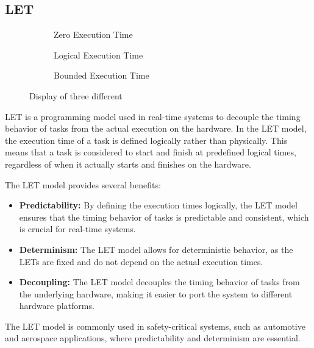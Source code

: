 \subsection{\ac{LET}}\label{sec:let}

\begin{figure}[ht]
	\begin{subfigure}[c]{0.45\textwidth}
		\resizebox{\textwidth}{!}{%
			\label{fig:model_ZET}
			
		}
		\caption{Zero Execution Time}
	\end{subfigure}
	\hfill
	\begin{subfigure}[c]{0.45\textwidth}
		\resizebox{\textwidth}{!}{%
			\label{fig:model_LET}
			
			}
		\caption{Logical Execution Time}
	\end{subfigure}
	\begin{subfigure}[c]{0.450\textwidth}
		\resizebox{\textwidth}{!}{%
			\label{fig:model_BET}
			
		}
		\caption{Bounded Execution Time}
	\end{subfigure}
	\caption{Display of three different }
\end{figure}
\ac{LET} is a programming model used in real-time systems to decouple the timing behavior of tasks from the actual execution on the hardware. In the \ac{LET} model, the execution time of a task is defined logically rather than physically. This means that a task is considered to start and finish at predefined logical times, regardless of when it actually starts and finishes on the hardware.

The \ac{LET} model provides several benefits:
\begin{itemize}
	\item \textbf{Predictability:} By defining the execution times logically, the \ac{LET} model ensures that the timing behavior of tasks is predictable and consistent, which is crucial for real-time systems.
	\item \textbf{Determinism:} The \ac{LET} model allows for deterministic behavior, as the \ac{LET}s are fixed and do not depend on the actual execution times.
	\item \textbf{Decoupling:} The \ac{LET} model decouples the timing behavior of tasks from the underlying hardware, making it easier to port the system to different hardware platforms.
\end{itemize}

The \ac{LET} model is commonly used in safety-critical systems, such as automotive and aerospace applications, where predictability and determinism are essential.

